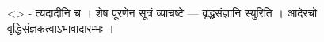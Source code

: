 \textless{}\textgreater{} - त्यदादीनि च । शेष पूरणेन सूत्रं व्याचष्टे
--- वृद्धसंज्ञानि स्युरिति । आदेरचो वृद्धिसंज्ञकत्वाऽभावादारम्भः ।
